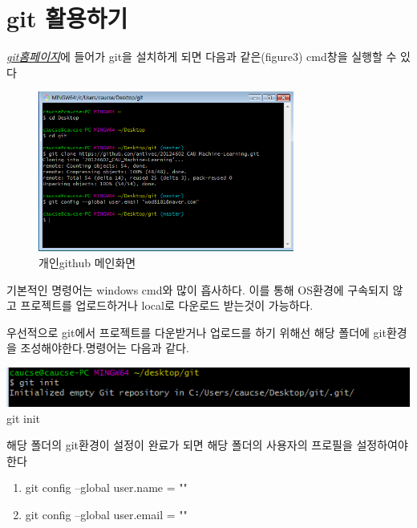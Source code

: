 \documentclass[12pt]{article}
\begin{document}
\section{git 활용하기}
	\textit{\href{https://git-scm.com/download/win}{git홈페이지}}에 들어가 git을 설치하게 되면 다음과 같은(figure3) cmd창을 실행할 수 있다
	\begin{figure}		
		\includegraphics[width=0.75\textwidth]{git_cmd}
		\caption{개인github 메인화면}
	\end{figure}

	
	기본적인 명령어는 windows cmd와 많이 흡사하다.
	이를 통해 OS환경에 구속되지 않고 프로젝트를 업로드하거나 local로 다운로드 받는것이 가능하다.
	
	우선적으로 git에서 프로젝트를 다운받거나 업로드를 하기 위해선 해당 폴더에 git환경을 조성해야한다.명령어는 다음과 같다.
	\begin{mdframed}[
		linecolor= black,
		roundcorner=10pt,
		innertopmargin =\topskip,
		leftmargin = 0.5cm,
		rightmargin = 0.5cm,
		frametitleaboveskip = 0.5pt,
		frametitlerulewidth = 0.5pt,
		frametitlealignment =,
		frametitlebackgroundcolor = yellow,			
		frametitle = {git환경 설정하기}	]
		\includegraphics[width=\textwidth]{git_init}
		git init		
	\end{mdframed}
	해당 폴더의 git환경이 설정이 완료가 되면 해당 폴더의 사용자의 프로필을 설정하여야 한다
	\begin{mdframed}[
		linecolor= black,
		roundcorner=10pt,
		innertopmargin =\topskip,
		leftmargin = 0.5cm,
		rightmargin = 0.5cm,
		frametitleaboveskip = 0.5pt,
		frametitlerulewidth = 0.5pt,
		frametitlealignment =,
		frametitlebackgroundcolor = yellow,			
		frametitle = {git프로필 설정하기}	]
		\begin{enumerate}
			\item git config --global user.name = ""		
			\item git config --global user.email = ""	

		\end{enumerate}  		
	\end{mdframed}
\end{document}

